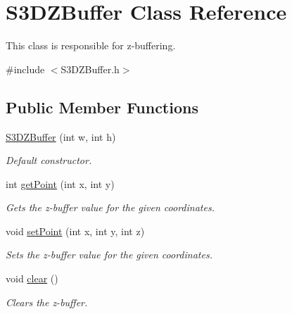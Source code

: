 \hypertarget{class_s3_d_z_buffer}{
\section{S3DZBuffer Class Reference}
\label{class_s3_d_z_buffer}
}


This class is responsible for z-\/buffering.  




{\ttfamily \#include $<$S3DZBuffer.h$>$}

\subsection*{Public Member Functions}
\begin{DoxyCompactItemize}
\item 
\hyperlink{class_s3_d_z_buffer_a8983fb4278e5baaa4bdf076f8e28d940}{S3DZBuffer} (int w, int h)
\begin{DoxyCompactList}\small\item\em Default constructor. \item\end{DoxyCompactList}\item 
int \hyperlink{class_s3_d_z_buffer_aba5f79850772a0500a629443e413e402}{getPoint} (int x, int y)
\begin{DoxyCompactList}\small\item\em Gets the z-\/buffer value for the given coordinates. \item\end{DoxyCompactList}\item 
void \hyperlink{class_s3_d_z_buffer_aa712e633bf2ccf4c43bb27178a1692c1}{setPoint} (int x, int y, int z)
\begin{DoxyCompactList}\small\item\em Sets the z-\/buffer value for the given coordinates. \item\end{DoxyCompactList}\item 
\hypertarget{class_s3_d_z_buffer_ab2b22d8f910724846765813cc6e8457e}{
void \hyperlink{class_s3_d_z_buffer_ab2b22d8f910724846765813cc6e8457e}{clear} ()}
\label{class_s3_d_z_buffer_ab2b22d8f910724846765813cc6e8457e}

\begin{DoxyCompactList}\small\item\em Clears the z-\/buffer. \item\end{DoxyCompactList}\end{DoxyCompactItemize}


